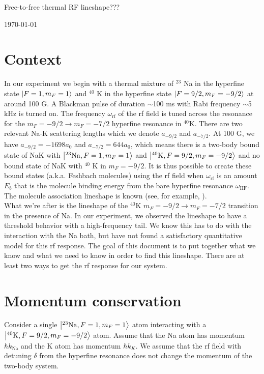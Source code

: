 \documentclass{article}
\theoremstyle{definition}
\begin{document}
\begin{center}
	\Large{Free-to-free thermal RF lineshape???}
\end{center}	

\begin{center}
	\today
\end{center}

\section{Context}

In our experiment we begin with a thermal mixture of $^{23}$ Na in the hyperfine state $\ket{F=1, m_F=1}$ and $^{40}$ K in the hyperfine state $\ket{F=9/2, m_F = -9/2}$ at around 100 G. A Blackman pulse of duration $\sim$100 ms with Rabi frequency $\sim$5 kHz is turned on. The frequency $\omega_\text{rf}$ of the rf field is tuned across the resonance for the $m_F = -9/2 \to m_F = -7/2$ hyperfine resonance in $^{40}$K. There are two relevant Na-K scattering lengths which we denote $a_{-9/2}$ and $a_{-7/2}$. At 100 G, we have $a_{-9/2} = -1698 a_0$ and $a_{-7/2} = 644 a_0$, which means there is a two-body bound state of NaK with  $\ket{^{23}\text{Na}, F=1, m_F=1}$ and $\ket{^{40} \text{K}, F=9/2, m_F = -9/2}$ and no bound state of NaK with $^{40}$ K in $m_F = -9/2$. It is thus possible to create these bound states (a.k.a. Feshbach molecules) using the rf field when $\omega_\text{rf}$ is an amount $E_b$ that is the molecule binding energy from the bare hyperfine resonance $\omega_\text{HF}$. The molecule association lineshape is known (see, for example, \cite{FB_rf_1}). \\

\noindent What we're after is the lineshape of the $^{40}$K $m_F = -9/2 \to m_F = -7/2$ transition in the presence of Na. In our experiment, we observed the lineshape to have a threshold behavior with a high-frequency tail. We know this has to do with the interaction with the Na bath, but have not found a satisfactory quantitative model for this rf response. The goal of this document is to put together what we know and what we need to know in order to find this lineshape. There are at least two ways to get the rf response for our system.

\section{Momentum conservation}

Consider a single $\ket{^{23}\text{Na}, F=1, m_F=1}$ atom interacting with a $\ket{^{40} \text{K}, F=9/2, m_F = -9/2}$ atom. Assume that the Na atom has momentum $\hbar k_\text{Na}$ and the K atom has momentum $\hbar k_{K}$. We assume that the rf field with detuning $\delta$ from the hyperfine resonance does not change the momentum of the two-body system. 
\end{document}
